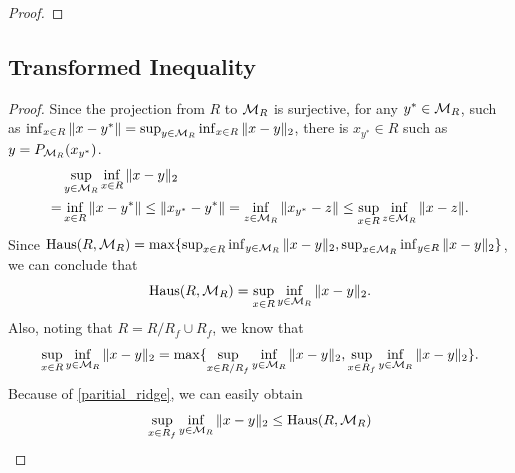 \documentclass[aos,preprint]{imsart}
\theoremstyle{remark}
\begin{document}
\begin{appendix}
\begin{proof}
\end{proof}
\subsection{Transformed Inequality}
\begin{proof}\label{Transformed Inequality}
Since the projection from $R$ to ${\cal M}_{R}$ is surjective, for any $y^*\in {\cal M}_{R}$, such as
$\inf_{x\in R} \|x-y^*\| = \sup_{y\in {\cal M}_R} \inf_{x\in R}\|x-y\|_2$, there is $x_{y^*}\in R$ such as $y = P_{{\cal M}_R}(x_{y^*})$. 
\[
\begin{aligned}
&\sup_{y\in {\cal M}_R} \inf_{x\in R}\|x-y\|_2 \\
=&\inf_{x\in R} \|x-y^*\| \leq \|x_{y^*} - y^*\| = \inf_{z\in{\cal M}_R }\|x_{y^*}-z\|\leq \sup_{x\in R}\inf_{z\in{\cal M}_R }\|x-z\|.
\end{aligned}
\]
Since ${\rm Haus} (R, {\cal M}_{R}) = \max \{\sup_{x\in R} \inf_{y\in {\cal M}_R} \|x-y\|_2, \sup_{x\in {\cal M}_R} \inf_{y\in R} \|x-y\|_2\}$, we can conclude that
\[
{\rm Haus} (R, {\cal M}_{R}) = \sup_{x\in R} \inf_{y\in {\cal M}_R} \|x-y\|_2.
\]
Also, noting that $R = R/R_f\cup R_f$, we know that
\begin{equation}\label{paritial_ridge}
\sup_{x\in R} \inf_{y\in {\cal M}_R} \|x-y\|_2 = \max\{\sup_{x\in R/R_f} \inf_{y\in {\cal M}_R} \|x-y\|_2, \sup_{x\in R_f} \inf_{y\in {\cal M}_R} \|x-y\|_2 \}.
\end{equation}
Because of \eqref{paritial_ridge}, we can easily obtain
\[
\sup_{x\in R_f} \inf_{y\in {\cal M}_R} \|x-y\|_2 \leq {\rm Haus} (R, {\cal M}_{R})
\]
\end{proof}

\end{appendix}



%


\end{document}
